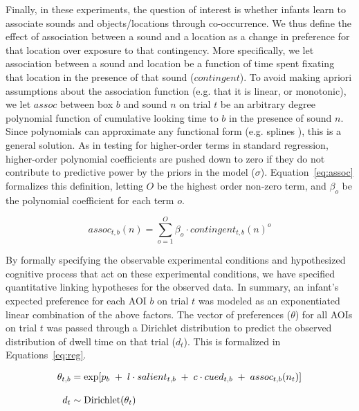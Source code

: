 \documentclass[12pt]{article}
\begin{document}
	Finally, in these experiments, the question of interest is whether infants learn to associate sounds and objects/locations through co-occurrence. We thus define the effect of association between a sound and a location as a change in preference for that location over exposure to that contingency. More specifically, we let association between a sound and location be a function of time spent fixating that location in the presence of that sound ($contingent$). To avoid making apriori assumptions about the association function (e.g. that it is linear, or monotonic), we let $assoc$ between box $b$ and sound $n$ on trial $t$ be an arbitrary degree polynomial function of cumulative looking time to $b$ in the presence of sound $n$. Since polynomials can approximate any functional form (e.g. splines \cite{Barr2008, Jackson2009}), this is a general solution. As in testing for higher-order terms in standard regression, higher-order polynomial coefficients are pushed down to zero if they do not contribute to predictive power by the priors in the model ($\sigma$). Equation~\ref{eq:assoc} formalizes this definition, letting $O$ be the highest order non-zero term, and $\beta_{o}$ be the polynomial coefficient for each term $o$.

\begin{equation}\label{eq:assoc}
assoc_{t,b}(n) = \sum_{o=1}^{O} \beta_{o} \cdot contingent_{t,b}(n)^o
\end{equation}

	By formally specifying the observable experimental conditions and hypothesized cognitive process that act on these experimental conditions, we have specified quantitative linking hypotheses for the observed data. In summary, an infant's expected preference for each AOI $b$ on trial $t$ was modeled as an exponentiated linear combination of the above factors. The vector of preferences ($\theta$) for all AOIs on trial $t$ was passed through a Dirichlet distribution to predict the observed distribution of dwell time on that trial ($d_{t}$). This is formalized in Equations~\ref{eq:reg}.

\begin{equation}\label{eq:reg}
\setlength{\jot}{12pt}
\begin{aligned}
\theta_{t,b} &= \text{exp}[p_{b}\; + \; l \cdot salient_{t,b}\; + \; c \cdot cued_{t,b}\; + \; assoc_{t,b}(n_{t})]\\
d_{t} &\sim  \text{Dirichlet}(\theta_{t})
\end{aligned}
\end{equation}
\end{document}
